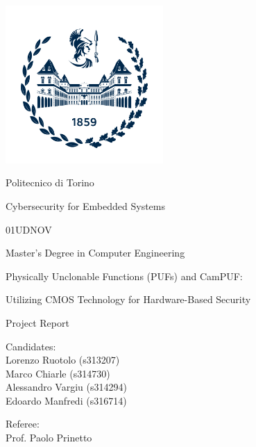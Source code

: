\documentclass[10pt,  english, makeidx, a4paper, titlepage, oneside]{book}
\begin{document}
\frontmatter
\begin{titlepage}
\vspace{0cm}
\centerline{
\includegraphics[width=6cm]{./logopolitonuovo}} 
\vspace{0.5cm}
\centerline{\LARGE Politecnico di Torino}
\vspace{2.5cm}
\centerline{\huge Cybersecurity for Embedded Systems}
\vspace{0.25cm}
\centerline{\huge 01UDNOV}
\vspace{1cm}
\centerline{\Large Master's Degree in Computer Engineering}
\vspace{2cm}
\centerline{\huge Physically Unclonable Functions (PUFs) and CamPUF:}
\centerline{\huge Utilizing CMOS Technology for Hardware-Based Security}
\bigskip
\centerline{\huge Project Report}
\vspace{2cm}
\vfill
\begin{minipage}{6.5cm} %
\Large{Candidates:\\
Lorenzo Ruotolo (s313207)\\
Marco Chiarle (s314730)\\
Alessandro Vargiu (s314294)\\
Edoardo Manfredi (s316714)}
\end{minipage}
\hfill
\begin{minipage}{4.4cm}
\Large{Referee: \\
Prof. Paolo Prinetto}
\end{minipage}
\end{titlepage}

\tableofcontents
\listoffigures %

\mainmatter
    


%








    

\appendix

%

\end{document}
